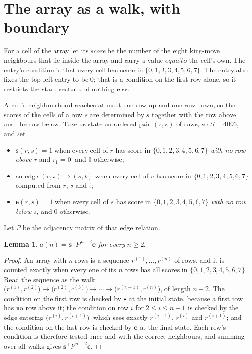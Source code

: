 \documentclass[11pt,a4paper]{article}
\theoremstyle{plain}
\newtheorem{lemma}[theorem]{Lemma}
\theoremstyle{definition}
\begin{document}
\section{The array as a walk, with boundary}

For a cell of the array let its \emph{score} be the number of the eight king-move neighbours that lie inside
the array and carry a value $equal to$ the cell's own. The entry's condition is that every cell
has score in $\{0,1,2,3,4,5,6,7\}$. The entry also fixes the top-left entry to be $0$; that is a condition on the first row alone, so it restricts the start vector and nothing else.

A cell's neighbourhood reaches at most one row up and one row down, so the scores of the
cells of a row $s$ are determined by $s$ together with the row above and the row below.
Take as state an ordered pair $(r,s)$ of rows, so $S=4096$, and set
\begin{itemize}
\item $\mathbf{s}(r,s)=1$ when every cell of $r$ has score in $\{0,1,2,3,4,5,6,7\}$ \emph{with no row
above $r$} and $r_1=0$, and $0$ otherwise;
\item an edge $(r,s)\to(s,t)$ when every cell of $s$ has score in $\{0,1,2,3,4,5,6,7\}$ computed from
$r$, $s$ and $t$;
\item $\mathbf{e}(r,s)=1$ when every cell of $s$ has score in $\{0,1,2,3,4,5,6,7\}$ \emph{with no row
below $s$}, and $0$ otherwise.
\end{itemize}
Let $P$ be the adjacency matrix of that edge relation.

\begin{lemma}\label{lem:walk}
$a(n)=\mathbf{s}^{\!\top}P^{\,n-2}\mathbf{e}$ for every $n\ge2$.
\end{lemma}

\begin{proof}
An array with $n$ rows is a sequence $r^{(1)},\dots,r^{(n)}$ of rows, and it is counted
exactly when every one of its $n$ rows has all scores in $\{0,1,2,3,4,5,6,7\}$. Read the sequence as the
walk $\bigl(r^{(1)},r^{(2)}\bigr)\to\bigl(r^{(2)},r^{(3)}\bigr)\to\cdots\to
\bigl(r^{(n-1)},r^{(n)}\bigr)$, of length $n-2$. The condition on the first row is
checked by $\mathbf{s}$ at the initial state, because a first row has no row above it; the
condition on row $i$ for $2\le i\le n-1$ is checked by the edge entering
$\bigl(r^{(i)},r^{(i+1)}\bigr)$, which sees exactly $r^{(i-1)}$, $r^{(i)}$ and
$r^{(i+1)}$; and the condition on the last row is checked by $\mathbf{e}$ at the final
state. Each row's condition is therefore tested once and with the correct neighbours, and
summing over all walks gives $\mathbf{s}^{\!\top}P^{\,n-2}\mathbf{e}$.
\end{proof}
\end{document}
